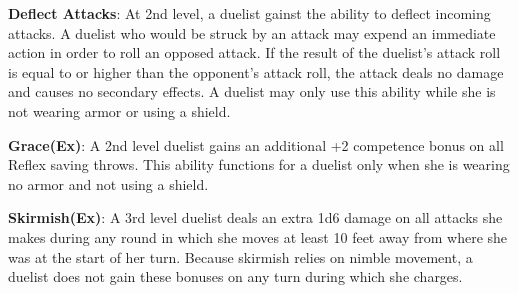 \textbf{Deflect Attacks}: At 2nd level, a duelist gainst the ability to deflect incoming attacks. A duelist who would be struck by an attack may expend an immediate action in order to roll an opposed attack. If the result of the duelist's attack roll is equal to or higher than the opponent's attack roll, the attack deals no damage and causes no secondary effects. A duelist may only use this ability while she is not wearing armor or using a shield.

\textbf{Grace(Ex)}: A 2nd level duelist gains an additional +2 competence bonus on all Reflex saving throws. This ability functions for a duelist only when she is wearing no armor and not using a shield.

\textbf{Skirmish(Ex)}: A 3rd level duelist deals an extra 1d6 damage on all attacks she makes during any round in which she moves at least 10 feet away from where she was at the start of her turn. Because skirmish relies on nimble movement, a duelist does not gain these bonuses on any turn during which she charges.

